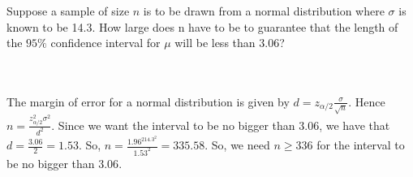 Suppose a sample of size $n$ is to be drawn from a normal distribution where $\sigma$ is known to be
14.3. How large does n have to be to guarantee that the length of the $95\%$ confidence interval for
$\mu$ will be less than 3.06?\\\\

\begin{solution}\renewcommand{\qedsymbol}{}\ \\
    The margin of error for a normal distribution is given by $d=z_{\alpha/2}\frac{\sigma}{\sqrt{n}}$.
    Hence $n=\frac{z_{\alpha/2}^2\sigma^2}{d^2}$. Since we want the interval to be no bigger than
    $3.06$, we have that $d=\frac{3.06}{2}=1.53$. So, $n=\frac{1.96^214.3^2}{1.53^2}=335.58$. So, we
    need $n\geq336$ for the interval to be no bigger than $3.06$.

\end{solution}